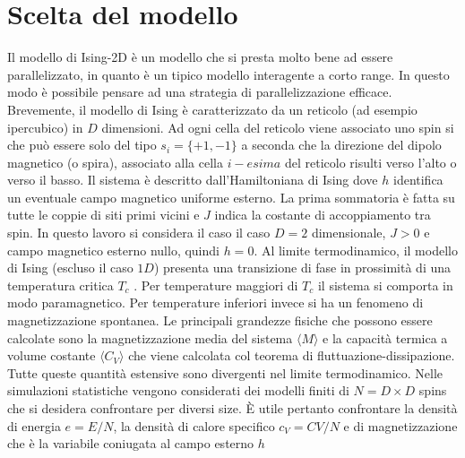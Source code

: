 \documentclass[a4paper,12pt]{article}
\begin{document}
\section{Scelta del modello}
Il modello di Ising-2D è un modello che si presta molto bene ad essere parallelizzato, in quanto è un tipico modello interagente a corto range. In questo modo è possibile pensare ad una strategia di parallelizzazione efficace. Brevemente, il modello di Ising è caratterizzato da un reticolo (ad esempio ipercubico) in $D$ dimensioni. Ad ogni cella del reticolo viene associato uno spin si che può essere solo del tipo $s_i=\lbrace +1, -1 \rbrace$ a seconda che la direzione del dipolo magnetico (o spira), associato alla cella $i-esima$ del reticolo risulti verso l'alto o verso il basso. Il sistema è descritto dall’Hamiltoniana di Ising
dove $h$ identifica un eventuale campo magnetico uniforme esterno. La prima sommatoria è fatta su tutte le coppie di siti primi vicini e $J$ indica la costante di accoppiamento tra spin. In questo lavoro si considera il caso il caso $D = 2$ dimensionale, $J > 0$ e campo magnetico esterno nullo, quindi $h = 0$. Al limite termodinamico, il modello di Ising (escluso il caso $1D$) presenta una transizione di fase in prossimità di una temperatura critica $T_c$ . Per temperature maggiori di $T_c$ il sistema si comporta in modo paramagnetico. Per temperature inferiori invece si ha un fenomeno di magnetizzazione spontanea. Le principali grandezze fisiche che possono essere calcolate sono la magnetizzazione media del sistema $\langle M\rangle$  e la capacità termica a volume costante $\langle C_V \rangle$ che viene calcolata col teorema di fluttuazione-dissipazione. Tutte queste quantità estensive sono divergenti nel limite termodinamico. Nelle simulazioni statistiche vengono considerati dei modelli finiti di $N = D \times D$ spins che si desidera confrontare per diversi size. È utile pertanto confrontare la densità di energia $e = E /N$, la densità di calore specifico $c_V = CV /N$ e di magnetizzazione che è la variabile coniugata al campo esterno $h$
\end{document}

